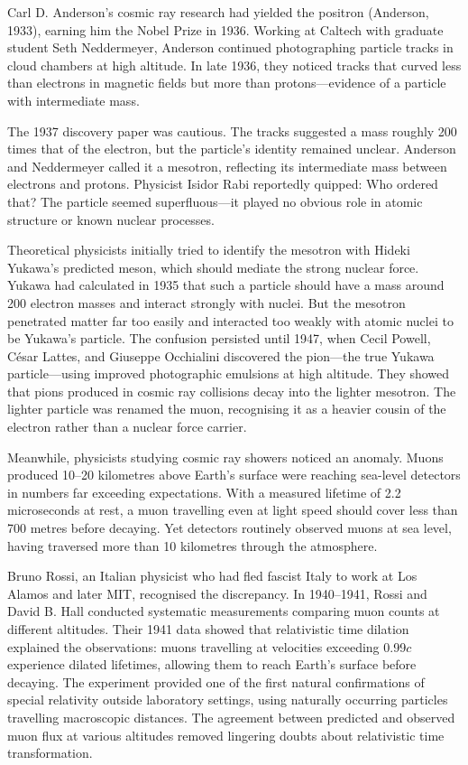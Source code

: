 \begin{historical}
Carl D. Anderson's cosmic ray research had yielded the positron (Anderson, 1933), earning him the Nobel Prize in 1936. Working at Caltech with graduate student Seth Neddermeyer, Anderson continued photographing particle tracks in cloud chambers at high altitude. In late 1936, they noticed tracks that curved less than electrons in magnetic fields but more than protons—evidence of a particle with intermediate mass.

The 1937 discovery paper was cautious. The tracks suggested a mass roughly 200 times that of the electron, but the particle's identity remained unclear. Anderson and Neddermeyer called it a \QSOpen{}mesotron,\QSClose{} reflecting its intermediate mass between electrons and protons. Physicist Isidor Rabi reportedly quipped: \QENOpen{}Who ordered that?\QENClose{} The particle seemed superfluous—it played no obvious role in atomic structure or known nuclear processes.

Theoretical physicists initially tried to identify the mesotron with Hideki Yukawa's predicted meson, which should mediate the strong nuclear force. Yukawa had calculated in 1935 that such a particle should have a mass around 200 electron masses and interact strongly with nuclei. But the mesotron penetrated matter far too easily and interacted too weakly with atomic nuclei to be Yukawa's particle. The confusion persisted until 1947, when Cecil Powell, César Lattes, and Giuseppe Occhialini discovered the pion—the true Yukawa particle—using improved photographic emulsions at high altitude. They showed that pions produced in cosmic ray collisions decay into the lighter mesotron. The lighter particle was renamed the muon, recognising it as a heavier cousin of the electron rather than a nuclear force carrier.

Meanwhile, physicists studying cosmic ray showers noticed an anomaly. Muons produced 10–20 kilometres above Earth's surface were reaching sea-level detectors in numbers far exceeding expectations. With a measured lifetime of 2.2 microseconds at rest, a muon travelling even at light speed should cover less than 700 metres before decaying. Yet detectors routinely observed muons at sea level, having traversed more than 10 kilometres through the atmosphere.

Bruno Rossi, an Italian physicist who had fled fascist Italy to work at Los Alamos and later MIT, recognised the discrepancy. In 1940–1941, Rossi and David B. Hall conducted systematic measurements comparing muon counts at different altitudes. Their 1941 data showed that relativistic time dilation explained the observations: muons travelling at velocities exceeding 0.99$c$ experience dilated lifetimes, allowing them to reach Earth's surface before decaying. The experiment provided one of the first natural confirmations of special relativity outside laboratory settings, using naturally occurring particles travelling macroscopic distances. The agreement between predicted and observed muon flux at various altitudes removed lingering doubts about relativistic time transformation.


\end{historical}
